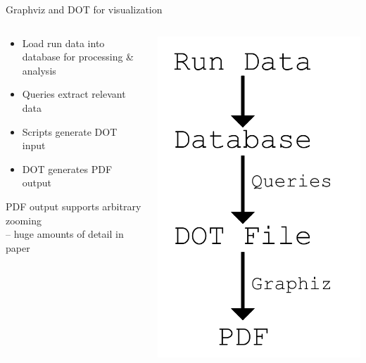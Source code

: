 \documentclass{beamer}
\begin{document}
\begin{frame}{Graphviz and DOT for visualization}
\begin{columns}
\begin{column}{.6\textwidth}
\begin{itemize}
    \setlength\itemsep{.5em}
	\item Load run data into database for processing \& analysis
    \item Queries extract relevant data
    \item Scripts generate DOT input
    \item DOT generates PDF output
\end{itemize}
\vspace{0.5cm}

PDF output supports arbitrary zooming \\ \hspace{.5cm} -- huge amounts of detail in paper
\end{column}
\begin{column}{.4\textwidth}
\includegraphics[width=.9\textwidth]{Illustrations/DOT_Graphiz.pdf}
\end{column}
\end{columns}
\end{frame}
\end{document}
